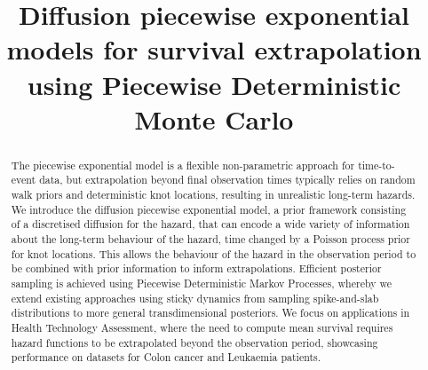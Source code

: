 \documentclass[ba,preprint]{imsart}
\theoremstyle{plain}
\theoremstyle{definition}
\theoremstyle{remark}
\begin{document}
\begin{frontmatter}
\title{Diffusion piecewise exponential models for survival extrapolation using Piecewise Deterministic Monte Carlo}


\begin{abstract}
The piecewise exponential model is a flexible non-parametric approach for time-to-event data, but extrapolation beyond final observation times typically relies on random walk priors and deterministic knot locations, resulting in unrealistic long-term hazards. We introduce the diffusion piecewise exponential model, a prior framework consisting of a discretised diffusion for the hazard, that can encode a wide variety of information about the long-term behaviour of the hazard, time changed by a Poisson process prior for knot locations. This allows the behaviour of the hazard in the observation period to be combined with prior information to inform extrapolations. Efficient posterior sampling is achieved using Piecewise Deterministic Markov Processes, whereby we extend existing approaches using sticky dynamics from sampling spike-and-slab distributions to more general transdimensional posteriors. We focus on applications in Health Technology Assessment, where the need to compute mean survival requires hazard functions to be extrapolated beyond the observation period, showcasing performance on datasets for Colon cancer and Leukaemia patients.
\end{abstract}


\end{frontmatter}
\end{document}
